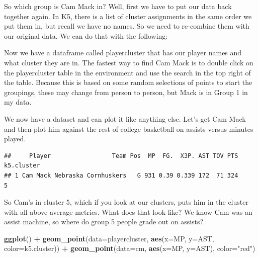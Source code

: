 \documentclass[]{book}
\newenvironment{Shaded}{\begin{snugshade}}{\end{snugshade}}
\newcommand{\DataTypeTok}[1]{\textcolor[rgb]{0.13,0.29,0.53}{#1}}
\newcommand{\KeywordTok}[1]{\textcolor[rgb]{0.13,0.29,0.53}{\textbf{#1}}}
\newcommand{\NormalTok}[1]{#1}
\newcommand{\OperatorTok}[1]{\textcolor[rgb]{0.81,0.36,0.00}{\textbf{#1}}}
\newcommand{\StringTok}[1]{\textcolor[rgb]{0.31,0.60,0.02}{#1}}
\begin{document}
So which group is Cam Mack in? Well, first we have to put our data back together again. In K5, there is a list of cluster assignments in the same order we put them in, but recall we have no names. So we need to re-combine them with our original data. We can do that with the following:

\begin{Shaded}
\end{Shaded}

Now we have a dataframe called playercluster that has our player names and what cluster they are in. The fastest way to find Cam Mack is to double click on the playercluster table in the environment and use the search in the top right of the table. Because this is based on some random selections of points to start the groupings, these may change from person to person, but Mack is in Group 1 in my data.

We now have a dataset and can plot it like anything else. Let's get Cam Mack and then plot him against the rest of college basketball on assists versus minutes played.

\begin{Shaded}
\end{Shaded}

\begin{verbatim}
##     Player                 Team Pos  MP  FG.  X3P. AST TOV PTS k5.cluster
## 1 Cam Mack Nebraska Cornhuskers   G 931 0.39 0.339 172  71 324          5
\end{verbatim}

So Cam's in cluster 5, which if you look at our clusters, puts him in the cluster with all above average metrics. What does that look like? We know Cam was an assist machine, so where do group 5 people grade out on assists?

\begin{Shaded}
\begin{Highlighting}[]
\KeywordTok{ggplot}\NormalTok{() }\OperatorTok{+}\StringTok{ }
\StringTok{  }\KeywordTok{geom_point}\NormalTok{(}\DataTypeTok{data=}\NormalTok{playercluster, }\KeywordTok{aes}\NormalTok{(}\DataTypeTok{x=}\NormalTok{MP, }\DataTypeTok{y=}\NormalTok{AST, }\DataTypeTok{color=}\NormalTok{k5.cluster)) }\OperatorTok{+}\StringTok{ }
\StringTok{  }\KeywordTok{geom_point}\NormalTok{(}\DataTypeTok{data=}\NormalTok{cm, }\KeywordTok{aes}\NormalTok{(}\DataTypeTok{x=}\NormalTok{MP, }\DataTypeTok{y=}\NormalTok{AST), }\DataTypeTok{color=}\StringTok{"red"}\NormalTok{)}
\end{Highlighting}
\end{Shaded}
\end{document}
